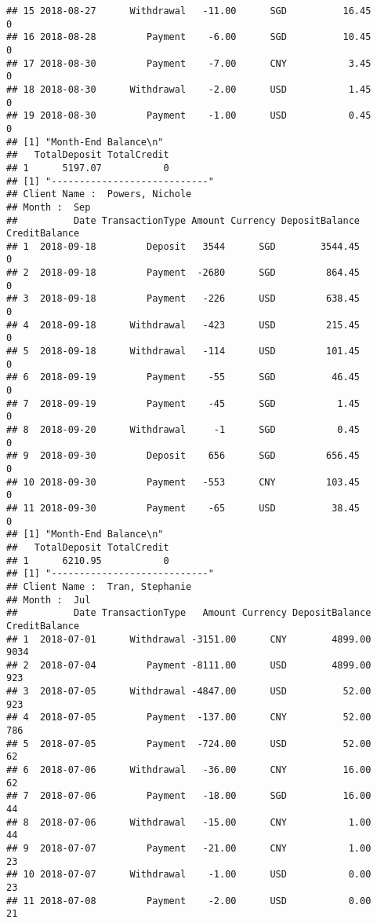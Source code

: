 \documentclass[]{article}
\begin{document}
\begin{verbatim}
## 15 2018-08-27      Withdrawal   -11.00      SGD          16.45             0
## 16 2018-08-28         Payment    -6.00      SGD          10.45             0
## 17 2018-08-30         Payment    -7.00      CNY           3.45             0
## 18 2018-08-30      Withdrawal    -2.00      USD           1.45             0
## 19 2018-08-30         Payment    -1.00      USD           0.45             0
## [1] "Month-End Balance\n"
##   TotalDeposit TotalCredit
## 1      5197.07           0
## [1] "----------------------------"
## Client Name :  Powers, Nichole 
## Month :  Sep 
##          Date TransactionType Amount Currency DepositBalance CreditBalance
## 1  2018-09-18         Deposit   3544      SGD        3544.45             0
## 2  2018-09-18         Payment  -2680      SGD         864.45             0
## 3  2018-09-18         Payment   -226      USD         638.45             0
## 4  2018-09-18      Withdrawal   -423      USD         215.45             0
## 5  2018-09-18      Withdrawal   -114      USD         101.45             0
## 6  2018-09-19         Payment    -55      SGD          46.45             0
## 7  2018-09-19         Payment    -45      SGD           1.45             0
## 8  2018-09-20      Withdrawal     -1      SGD           0.45             0
## 9  2018-09-30         Deposit    656      SGD         656.45             0
## 10 2018-09-30         Payment   -553      CNY         103.45             0
## 11 2018-09-30         Payment    -65      USD          38.45             0
## [1] "Month-End Balance\n"
##   TotalDeposit TotalCredit
## 1      6210.95           0
## [1] "----------------------------"
## Client Name :  Tran, Stephanie 
## Month :  Jul 
##          Date TransactionType   Amount Currency DepositBalance CreditBalance
## 1  2018-07-01      Withdrawal -3151.00      CNY        4899.00          9034
## 2  2018-07-04         Payment -8111.00      USD        4899.00           923
## 3  2018-07-05      Withdrawal -4847.00      USD          52.00           923
## 4  2018-07-05         Payment  -137.00      CNY          52.00           786
## 5  2018-07-05         Payment  -724.00      USD          52.00            62
## 6  2018-07-06      Withdrawal   -36.00      CNY          16.00            62
## 7  2018-07-06         Payment   -18.00      SGD          16.00            44
## 8  2018-07-06      Withdrawal   -15.00      CNY           1.00            44
## 9  2018-07-07         Payment   -21.00      CNY           1.00            23
## 10 2018-07-07      Withdrawal    -1.00      USD           0.00            23
## 11 2018-07-08         Payment    -2.00      USD           0.00            21

\end{verbatim}
\end{document}
